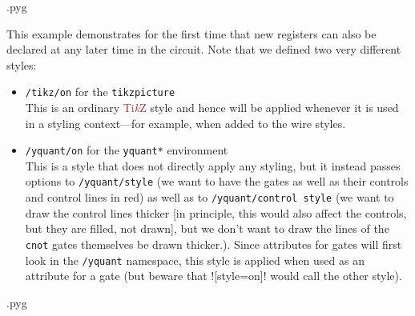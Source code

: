 \documentclass{scrartcl}
\makeatletter
\newenvironment{codeexample}{%
   \VerbatimEnvironment%
   \let\FVB@VerbatimOut\minted@FVB@VerbatimOut
   \let\FVE@VerbatimOut\minted@FVE@VerbatimOut
   \minted@configlang{tex}%
   \minted@fvset
   \begin{VerbatimOut}[codes={\catcode`\^^I=12},firstline,lastline]{\minted@jobname.pyg}%
}{
   \end{VerbatimOut}%
   \minted@langlinenoson%
   \savebox\codeexamplebox{ \minted@jobname.pyg}%
   \ifdim\wd\codeexamplebox>\dimexpr.5\linewidth-3mm\relax%
      \wd\codeexamplebox=.5\linewidth%
   \else%
      \wd\codeexamplebox=\dimexpr\wd\codeexamplebox+3mm\relax%
   \fi%
   \noindent\begin{minipage}{\wd\codeexamplebox}%
      \centering%
      \usebox\codeexamplebox%
   \end{minipage}%
   \begin{minipage}{\dimexpr\linewidth-\wd\codeexamplebox\relax}%
      \expandafter\minted@pygmentize\expandafter{\minted@lang}%
   \end{minipage}%
   \minted@langlinenosoff%
   \par%
}
\def\TikZ{\textcolor{brown}{Ti\textit kZ}}
\def\ttlink{\link\texttt}
\makeatother
\begin{document}
               \begin{example}
                  \begin{codeexample}
                  \end{codeexample}
                  This example demonstrates for the first time that new registers can also be declared at any later time in the circuit.
                  Note that we defined two very different styles:
                  \begin{itemize}
                     \item \texttt{/tikz/on} for the \texttt{tikzpicture} \\
                        This is an ordinary \TikZ{} style and hence will be applied whenever it is used in a styling context---for example, when added to the wire styles.
                     \item \texttt{/yquant/on} for the \texttt{yquant*} environment \\
                        This is a style that does not directly apply any styling, but it instead passes options to \ttlink{/yquant/style} (we want to have the gates as well as their controls and control lines in red) as well as to \ttlink{/yquant/control style} (we want to draw the control lines thicker [in principle, this would also affect the controls, but they are filled, not drawn], but we don't want to draw the lines of the \ttlink{cnot} gates themselves be drawn thicker.).
                        Since attributes for gates will first look in the \texttt{/yquant} namespace, this style is applied when used as an attribute for a gate (but beware that \yquant![style=on]! would call the other style).
                  \end{itemize}
               \end{example}

               \begin{example}
                  \begin{codeexample}
                  \end{codeexample}
               \end{example}
\end{document}
